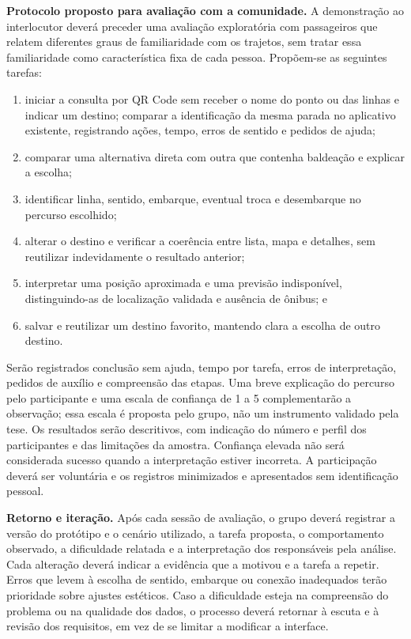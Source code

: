 \documentclass[12pt,oneside,a4paper,brazil]{abntex2}
\begin{document}
\textbf{Protocolo proposto para avaliação com a comunidade.} A demonstração ao interlocutor deverá preceder uma avaliação exploratória com passageiros que relatem diferentes graus de familiaridade com os trajetos, sem tratar essa familiaridade como característica fixa de cada pessoa. Propõem-se as seguintes tarefas:
\begin{enumerate}
\item iniciar a consulta por QR Code sem receber o nome do ponto ou das linhas e indicar um destino; comparar a identificação da mesma parada no aplicativo existente, registrando ações, tempo, erros de sentido e pedidos de ajuda;
\item comparar uma alternativa direta com outra que contenha baldeação e explicar a escolha;
\item identificar linha, sentido, embarque, eventual troca e desembarque no percurso escolhido;
\item alterar o destino e verificar a coerência entre lista, mapa e detalhes, sem reutilizar indevidamente o resultado anterior;
\item interpretar uma posição aproximada e uma previsão indisponível, distinguindo-as de localização validada e ausência de ônibus; e
\item salvar e reutilizar um destino favorito, mantendo clara a escolha de outro destino.
\end{enumerate}

Serão registrados conclusão sem ajuda, tempo por tarefa, erros de interpretação, pedidos de auxílio e compreensão das etapas. Uma breve explicação do percurso pelo participante e uma escala de confiança de 1 a 5 complementarão a observação; essa escala é proposta pelo grupo, não um instrumento validado pela tese. Os resultados serão descritivos, com indicação do número e perfil dos participantes e das limitações da amostra. Confiança elevada não será considerada sucesso quando a interpretação estiver incorreta. A participação deverá ser voluntária e os registros minimizados e apresentados sem identificação pessoal.

\textbf{Retorno e iteração.} Após cada sessão de avaliação, o grupo deverá registrar a versão do protótipo e o cenário utilizado, a tarefa proposta, o comportamento observado, a dificuldade relatada e a interpretação dos responsáveis pela análise. Cada alteração deverá indicar a evidência que a motivou e a tarefa a repetir. Erros que levem à escolha de sentido, embarque ou conexão inadequados terão prioridade sobre ajustes estéticos. Caso a dificuldade esteja na compreensão do problema ou na qualidade dos dados, o processo deverá retornar à escuta e à revisão dos requisitos, em vez de se limitar a modificar a interface.
\end{document}
